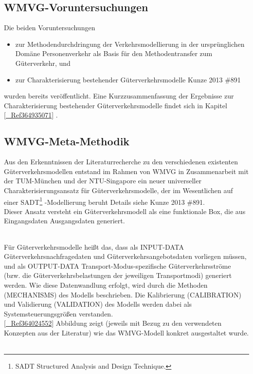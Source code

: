 % 
\subsection{WMVG-Voruntersuchungen}
\label{_Toc364945126}
\label{_Toc365801598}
\label{_Toc366766097}
\label{_Toc366775291}
\label{_Ref361847294}
\label{_Toc363572025}
\label{_Toc363601738}
Die beiden Voruntersuchungen~\\

\begin{itemize}
%
   \item zur Methodendurchdringung der Verkehrsmodellierung in der ursprünglichen Domäne \glqq Personenverkehr als Basis für den Methodentransfer zum Güterverkehr, und
   \item zur Charakterisierung bestehender Güterverkehrsmodelle {Kunze 2013 \#891}
%
\end{itemize}
wurden bereits veröffentlicht. Eine Kurzzusammenfassung der Ergebnisse zur Charakterisierung bestehender Güterverkehrsmodelle findet sich in Kapitel \autoref{_Ref364935071} .~\\


% 
\subsection{WMVG-Meta-Methodik}
\label{_Toc365801599}
\label{_Toc366766098}
\label{_Toc366775292}
Aus den Erkenntnissen der Literaturrecherche zu den verschiedenen existenten Güterverkehrsmodellen entstand im Rahmen von WMVG in Zusammenarbeit mit der TUM-München und der NTU-Singapore ein neuer universeller Charakterisierungsansatz für Güterverkehrsmodelle, der im Wesentlichen auf einer SADT\footnote{%
 SADT Structured Analysis and Design Technique.
}%
-Modellierung beruht {Details siehe  Kunze 2013 \#891}.~\\
Dieser Ansatz versteht ein Güterverkehrsmodell als eine funktionale Box, die aus Eingangsdaten Ausgangsdaten generiert.~\\

\begin{figure}[htbp]
  \centering
  \caption{}
  \label{}
\end{figure}
~\\
Für Güterverkehrsmodelle heißt das, dass als INPUT-DATA Güterverkehrsnachfragedaten und Güterverkehrsangebotsdaten vorliegen müssen, und als OUTPUT-DATA Transport-Modus-spezifische Güterverkehrsströme (bzw. die Güterverkehrsbelastungen der jeweiligen Transportmodi) generiert werden. Wie diese Datenwandlung erfolgt, wird durch die Methoden (MECHANISMS) des Modells beschrieben. Die Kalibrierung (CALIBRATION) und Validierung (VALIDATION) des Modells werden dabei als Systemsteuerungsgrößen verstanden.~\\
\autoref{_Ref364024552} Abbildung  zeigt (jeweils mit Bezug zu den verwendeten Konzepten aus der Literatur) wie das WMVG-Modell konkret ausgestaltet wurde.
\label{_Ref361847088}
\label{_Toc363572026}
\label{_Toc363601739}~\\

